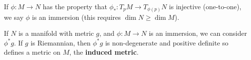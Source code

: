 If $\phi : M \to N$ has the property that $\phi_* : T_p M \to T_{\phi \left( p \right) } N$ is injective (one-to-one), we say $\phi$ is an immersion (this requires $\dim N \geq \dim M$).

If $N$ is a manifold with metric $g$, and $\phi : M \to N$ is an immersion, we can consider $\phi^{*} g$. If $g$ is Riemannian, then $\phi^{*} g$ is non-degenerate and positive definite so defines a metric on $M$, the \textbf{induced metric}.


